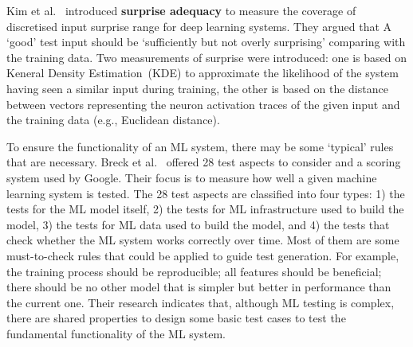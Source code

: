 Kim et al.~ introduced 
\textbf{surprise adequacy} to measure the coverage of discretised input surprise range for deep learning systems.
They argued that 
A `good' test input should be `sufficiently but not overly surprising' comparing with the training data.
Two measurements of surprise were introduced: one is based on Keneral Density Estimation~(KDE) to approximate the likelihood of the system having seen a similar input during
training, 
the other is based on the distance between vectors representing
the neuron activation traces of the given input and the training data (e.g., Euclidean distance).

To ensure the functionality of an ML system, there may be some `typical' rules that are necessary.
Breck et al.~ offered 28 test aspects to consider and a scoring system used by Google.
Their focus is to measure how well a given machine learning system is tested. 
The 28 test aspects are classified into four types: 
1) the tests for the ML model itself, 2) the tests for ML infrastructure used to build the model, 
3) the tests for ML data used to build the model,
and 4) the tests that check whether the ML system works correctly over time.
Most of them are some must-to-check rules that could be applied to guide test generation.
For example, the training process should be reproducible; all features should be beneficial; 
there should be no other model that is simpler but better in performance than the current one.
Their research indicates that, although ML testing is complex, there are shared properties to design some basic test cases to test the fundamental functionality of the ML system.

